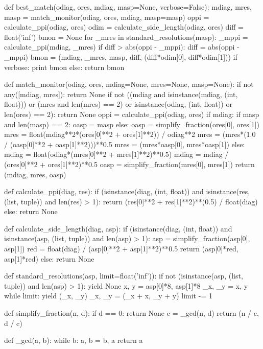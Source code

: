 \documentclass[12pt,letterpaper]{amsart}
\begin{document}
  \begin{python}
def best_match(odiag, ores, mdiag, masp=None, verbose=False):
    mdiag, mres, masp = match_monitor(odiag, ores, mdiag, masp=masp)
    oppi = calculate_ppi(odiag, ores)
    odim = calculate_side_length(odiag, ores)
    diff = float('inf')
    bmon = None
    for _mres in standard_resolutions(masp):
        _mppi = calculate_ppi(mdiag, _mres)
        if diff > abs(oppi - _mppi):
            diff = abs(oppi - _mppi)
            bmon = (mdiag, _mres, masp, diff, (diff*odim[0], diff*odim[1]))
            if verbose:
                print bmon
        else:
            return bmon

def match_monitor(odiag, ores, mdiag=None, mres=None, masp=None):
    if not any([mdiag, mres]):
        return None
    if not ((mdiag and isinstance(mdiag, (int, float)))
             or (mres and len(mres) == 2)
             or isinstance(odiag, (int, float))
             or len(ores) == 2):
        return None
    oppi = calculate_ppi(odiag, ores)
    if mdiag:
        if masp and len(masp) == 2:
            oasp = masp
        else:
            oasp = simplify_fraction(ores[0], ores[1])
        mres = float(mdiag**2*(ores[0]**2 + ores[1]**2)) / odiag**2
        mres = (mres*(1.0 / (oasp[0]**2 + oasp[1]**2)))**0.5
        mres = (mres*oasp[0], mres*oasp[1])
    else:
        mdiag = float(odiag*(mres[0]**2 + mres[1]**2)**0.5)
        mdiag = mdiag / (ores[0]**2 + ores[1]**2)**0.5
        oasp = simplify_fraction(mres[0], mres[1])
    return (mdiag, mres, oasp)

def calculate_ppi(diag, res):
    if (isinstance(diag, (int, float))
        and isinstance(res, (list, tuple))
        and len(res) > 1):
        return (res[0]**2 + res[1]**2)**(0.5) / float(diag)
    else:
        return None

def calculate_side_length(diag, asp):
    if (isinstance(diag, (int, float))
        and isinstance(asp, (list, tuple))
        and len(asp) > 1):
        asp = simplify_fraction(asp[0], asp[1])
        red = float(diag) / (asp[0]**2 + asp[1]**2)**0.5
        return (asp[0]*red, asp[1]*red)
    else:
        return None

def standard_resolutions(asp, limit=float('inf')):
    if not (isinstance(asp, (list, tuple))
            and len(asp) > 1):
        yield None
    x, y = asp[0]*8, asp[1]*8
    _x, _y = x, y
    while limit:
        yield (_x, _y)
        _x, _y = (_x + x, _y + y)
        limit -= 1

def simplify_fraction(n, d):
    if d == 0:
        return None
    c = _gcd(n, d)
    return (n / c, d / c)

def _gcd(a, b):
    while b:
        a, b = b, a %
    return a
  \end{python}
\end{document}

